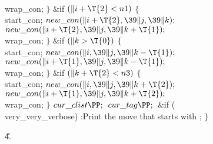 \\{wrap\_con};\6
\4${}\}{}$\2\6
\&{if} ${}(\|i+\T{2}<\\{n1}){}$\5
${}\{{}$\1\6
\\{start\_con};\6
${}\\{new\_con}(\|i+\T{2},\39\|j,\39\|k);{}$\6
${}\\{new\_con}(\|i+\T{2},\39\|j,\39\|k+\T{1});{}$\6
\\{wrap\_con};\6
\4${}\}{}$\2\6
\&{if} ${}(\|k>\T{0}){}$\5
${}\{{}$\1\6
\\{start\_con};\6
${}\\{new\_con}(\|i,\39\|j,\39\|k-\T{1});{}$\6
${}\\{new\_con}(\|i+\T{1},\39\|j,\39\|k-\T{1});{}$\6
\\{wrap\_con};\6
\4${}\}{}$\2\6
\&{if} ${}(\|k+\T{2}<\\{n3}){}$\5
${}\{{}$\1\6
\\{start\_con};\6
${}\\{new\_con}(\|i,\39\|j,\39\|k+\T{2});{}$\6
${}\\{new\_con}(\|i+\T{1},\39\|j,\39\|k+\T{2});{}$\6
\\{wrap\_con};\6
\4${}\}{}$\2\6
${}\\{cur\_clist}\PP;{}$\6
${}\\{cur\_tag}\PP;{}$\6
\&{if} (\\{very\_very\_verbose})\1\5
:Print the move that starts with \X;\2\6
\4${}\}{}$\2\2\2\par
\U4.\fi

